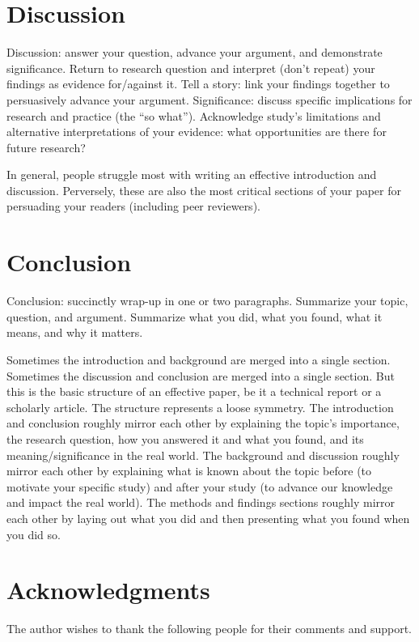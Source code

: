 \documentclass[12pt,letterpaper]{article} %
\begin{document}
\section{Discussion}

Discussion: answer your question, advance your argument, and demonstrate significance. Return to research question and interpret (don't repeat) your findings as evidence for/against it. Tell a story: link your findings together to persuasively advance your argument. Significance: discuss specific implications for research and practice (the \enquote{so what}). Acknowledge study's limitations and alternative interpretations of your evidence: what opportunities are there for future research?

In general, people struggle most with writing an effective introduction and discussion. Perversely, these are also the most critical sections of your paper for persuading your readers (including peer reviewers).

\section{Conclusion}

Conclusion: succinctly wrap-up in one or two paragraphs. Summarize your topic, question, and argument. Summarize what you did, what you found, what it means, and why it matters.

Sometimes the introduction and background are merged into a single section. Sometimes the discussion and conclusion are merged into a single section. But this is the basic structure of an effective paper, be it a technical report or a scholarly article. The structure represents a loose symmetry. The introduction and conclusion roughly mirror each other by explaining the topic's importance, the research question, how you answered it and what you found, and its meaning/significance in the real world. The background and discussion roughly mirror each other by explaining what is known about the topic before (to motivate your specific study) and after your study (to advance our knowledge and impact the real world). The methods and findings sections roughly mirror each other by laying out what you did and then presenting what you found when you did so.

\section*{Acknowledgments}

The author wishes to thank the following people for their comments and support.


\setlength{\bibsep}{0.00cm plus 0.05cm} %


\end{document}
